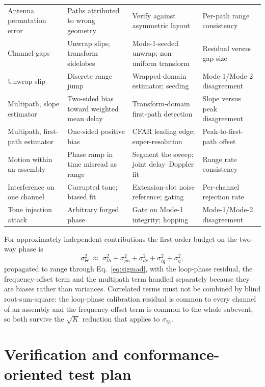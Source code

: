 \documentclass[11pt,a4paper]{article}
\begin{document}
\begin{table}[h]
\begin{tabular}{@{}L{30mm}L{34mm}L{34mm}L{30mm}@{}}
Antenna permutation error & Paths attributed to wrong geometry & Verify against asymmetric layout & Per-path range consistency \\
Channel gaps & Unwrap slips; transform sidelobes & Mode-1-seeded unwrap; non-uniform transform & Residual versus gap size \\
Unwrap slip & Discrete range jump & Wrapped-domain estimator; seeding & Mode-1/Mode-2 disagreement \\
Multipath, slope estimator & Two-sided bias toward weighted mean delay & Transform-domain first-path detection & Slope versus peak disagreement \\
Multipath, first-path estimator & One-sided positive bias & CFAR leading edge; super-resolution & Peak-to-first-path offset \\
Motion within an assembly & Phase ramp in time misread as range & Segment the sweep; joint delay--Doppler fit & Range rate consistency \\
Interference on one channel & Corrupted tone; biased fit & Extension-slot noise reference; gating & Per-channel rejection rate \\
Tone injection attack & Arbitrary forged phase & Gate on Mode-1 integrity; hopping & Mode-1/Mode-2 disagreement \\
\bottomrule
\end{tabular}
\end{table}

For approximately independent contributions the first-order budget on the two-way phase is
\begin{equation}
\sigma_\Theta^2 \;\approx\; \sigma_{th}^2 + \sigma_{pn}^2 + \sigma_{dc}^2 + \sigma_{iq}^2
   + \sigma_{q}^2 ,
\label{eq:budget}
\end{equation}
propagated to range through Eq.~\eqref{eq:sigmad}, with the loop-phase residual, the
frequency-offset term and the multipath term handled separately because they are biases rather than
variances. Correlated terms must not be combined by blind root-sum-square: the loop-phase calibration
residual is common to every channel of an assembly and the frequency-offset term is common to the
whole subevent, so both survive the $\sqrt{K}$ reduction that applies to $\sigma_{th}$.

\section{Verification and conformance-oriented test plan}
\end{document}
